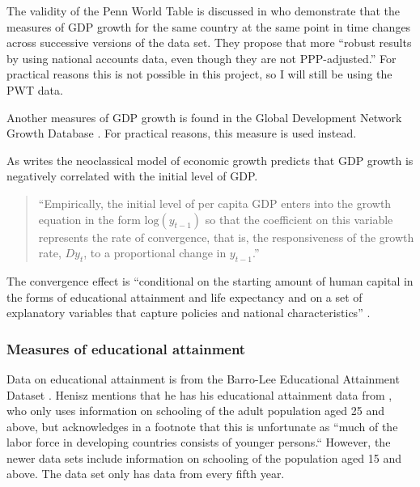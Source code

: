 \documentclass{article}\usepackage{graphicx, color}
\makeatletter
\newenvironment{kframe}{%
 \def\at@end@of@kframe{}%
 \ifinner\ifhmode%
  \def\at@end@of@kframe{\end{minipage}}%
  \begin{minipage}{\columnwidth}%
 \fi\fi%
 \def\FrameCommand##1{\hskip\@totalleftmargin \hskip-\fboxsep
 \colorbox{shadecolor}{##1}\hskip-\fboxsep
     \hskip-\linewidth \hskip-\@totalleftmargin \hskip\columnwidth}%
 \MakeFramed {\advance\hsize-\width
   \@totalleftmargin\z@ \linewidth\hsize
   \@setminipage}}%
 {\par\unskip\endMakeFramed%
 \at@end@of@kframe}
\newenvironment{knitrout}{}{} %
\makeatother
\begin{document}
The validity of the Penn World Table is discussed in \citet{johnson2009isnewer2}
who demonstrate that the measures of GDP growth for the same country
at the same point in time changes across successive versions of the
data set. They propose that more ``robust results by using national
accounts data, even though they are not PPP-adjusted.'' For practical
reasons this is not possible in this project, so I will still be using
the PWT data.

Another measures of GDP growth is found in the Global Development
Network Growth Database \citep{easterly2001globaldevelopment}. For
practical reasons, this measure is used instead.

As \citet[p. 4]{barro1996democracy} writes the neoclassical model
of economic growth predicts that GDP growth is negatively correlated
with the initial level of GDP. 
\begin{quote}
``Empirically, the initial level of per capita GDP enters into the
growth equation in the form $\text{log}(y_{t-1})$ so that the coefficient
on this variable represents the rate of convergence, that is, the
responsiveness of the growth rate, $Dy_{t}$, to a proportional change
in $y_{t-1}$.''\citep[p. 237]{barro2003determinants}
\end{quote}
The convergence effect is ``conditional on the starting amount of
human capital in the forms of educational attainment and life expectancy
and on a set of explanatory variables that capture policies and national
characteristics'' \citep[p. 273]{barro2003determinants}.

\begin{knitrout}
\color{fgcolor}\begin{kframe}


{\ttfamily\noindent\color{warningcolor}{\#\# Warning: NaNs produced}}\end{kframe}
\end{knitrout}



\subsubsection{Measures of educational attainment}

Data on educational attainment is from the Barro-Lee Educational Attainment
Dataset \citep{barro2010anew}. Henisz \citeyearpar{henisz2000theinstitutional}
mentions that he has his educational attainment data from \citet{barro1994sources},
who only uses information on schooling of the adult population aged
25 and above, but acknowledges in a footnote that this is unfortunate
as ``much of the labor force in developing countries consists of
younger persons.`` However, the newer data sets include information
on schooling of the population aged 15 and above. The data set only
has data from every fifth year.
\end{document}
